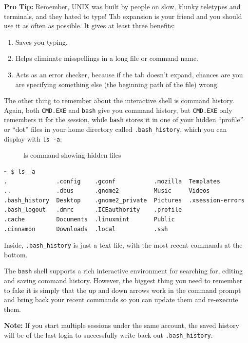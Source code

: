 \documentclass[10pt,]{book}
\numberwithin{figure}{chapter}
\DeclareRobustCommand{\drcap}[1]{\begin{figure}[H]\caption{#1}\end{figure}}
\begin{document}
\textbf{Pro Tip:} Remember, UNIX was built by people on slow, klunky
teletypes and terminals, and they hated to type! Tab expansion is your
friend and you should use it as often as possible. It gives at least
three benefits:

\begin{enumerate}
\def\labelenumi{\arabic{enumi}.}
\item
  Saves you typing.
\item
  Helps eliminate misspellings in a long file or command name.
\item
  Acts as an error checker, because if the tab doesn't expand, chances
  are you are specifying something else (the beginning path of the file)
  wrong.
\end{enumerate}

The other thing to remember about the interactive shell is command
history. Again, both \texttt{CMD.EXE} and \texttt{bash} give you command
history, but \texttt{CMD.EXE} only remembers it for the session, while
\texttt{bash} stores it in one of your hidden ``profile'' or ``dot''
files in your home directory called \texttt{.bash\_history}, which you
can display with \texttt{ls -a}:

\drcap{ls command showing hidden files}

\begin{verbatim}
~ $ ls -a
.              .config    .gconf           .mozilla  Templates
..             .dbus      .gnome2          Music     Videos
.bash_history  Desktop    .gnome2_private  Pictures  .xsession-errors
.bash_logout   .dmrc      .ICEauthority    .profile
.cache         Documents  .linuxmint       Public
.cinnamon      Downloads  .local           .ssh
\end{verbatim}

Inside, \texttt{.bash\_history} is just a text file, with the most
recent commands at the bottom.

The \texttt{bash} shell supports a rich interactive environment for
searching for, editing and saving command history. However, the biggest
thing you need to remember to fake it is simply that the up and down
arrows work in the command prompt and bring back your recent commands so
you can update them and re-execute them.

\textbf{Note:} If you start multiple sessions under the same account,
the saved history will be of the last login to successfully write back
out \texttt{.bash\_history}.

\end{document}
